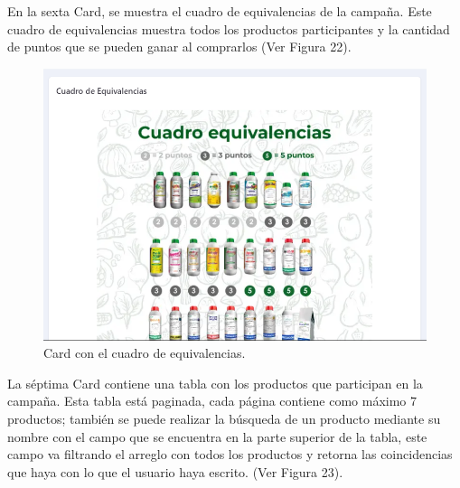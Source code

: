 En la sexta Card, se muestra el cuadro de equivalencias de la campaña. Este cuadro de equivalencias muestra todos los productos participantes y la cantidad de puntos que se pueden ganar al comprarlos (Ver Figura 22).

    \begin{figure}[H]
        \begin{center}
            \includegraphics[scale=0.40]{img/actividades/detalles-campanias/card-equivalencias.png}
            \caption{Card con el cuadro de equivalencias.}
            \label{fig:card-equivalencias}
        \end{center}
    \end{figure}

La séptima Card contiene una tabla con los productos que participan en la campaña. Esta tabla está paginada, cada página contiene como máximo 7 productos; también se puede realizar la búsqueda de un producto mediante su nombre con el campo que se encuentra en la parte superior de la tabla, este campo va filtrando el arreglo con todos los productos y retorna las coincidencias que haya con lo que el usuario haya escrito. (Ver Figura 23). 

